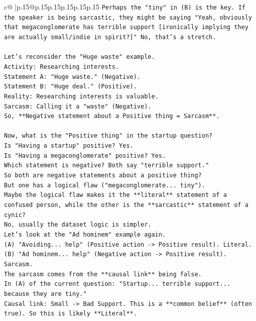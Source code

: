 \documentclass{article}
\begin{document}
{\begin{supertabular}{c@{$\;$}|p{.15\linewidth}@{}p{.15\linewidth}p{.15\linewidth}p{.15\linewidth}p{.15\linewidth}p{.15\linewidth}}
{{{\texttt{Perhaps the "tiny" in (B) is the key. If the speaker is being sarcastic, they might be saying "Yeah, obviously that megaconglomerate has terrible support {[}ironically implying they are actually small/indie in spirit?{]}" No, that's a stretch.} \\
\\ 
\texttt{Let's reconsider the "Huge waste" example.} \\
\texttt{Activity: Researching interests.} \\
\texttt{Statement A: "Huge waste." (Negative).} \\
\texttt{Statement B: "Huge deal." (Positive).} \\
\texttt{Reality: Researching interests is valuable.} \\
\texttt{Sarcasm: Calling it a "waste" (Negative).} \\
\texttt{So, **Negative statement about a Positive thing = Sarcasm**.} \\
\\ 
\texttt{Now, what is the "Positive thing" in the startup question?} \\
\texttt{Is "Having a startup" positive? Yes.} \\
\texttt{Is "Having a megaconglomerate" positive? Yes.} \\
\texttt{Which statement is negative? Both say "terrible support."} \\
\texttt{So both are negative statements about a positive thing?} \\
\texttt{But one has a logical flaw ("megaconglomerate... tiny").} \\
\texttt{Maybe the logical flaw makes it the **literal** statement of a confused person, while the other is the **sarcastic** statement of a cynic?} \\
\texttt{No, usually the dataset logic is simpler.} \\
\texttt{Let's look at the "Ad hominem" example again.} \\
\texttt{(A) "Avoiding... help" (Positive action {-}> Positive result). Literal.} \\
\texttt{(B) "Ad hominem... help" (Negative action {-}> Positive result). Sarcasm.} \\
\texttt{The sarcasm comes from the **causal link** being false.} \\
\texttt{In (A) of the current question: "Startup... terrible support... because they are tiny."} \\
\texttt{Causal link: Small {-}> Bad Support. This is a **common belief** (often true). So this is likely **Literal**.} \\
}}}
\end{supertabular}}
\end{document}
